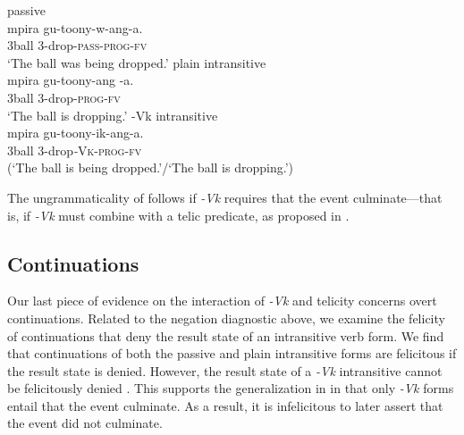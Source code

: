 \documentclass[output=paper]{langsci/langscibook}
\begin{document}
\ea\label{ex:gluckman:14} 
  \ea\label{ex:gluckman:14a}
  {{passive}}\\
  \gll mpira gu-toony-w-ang-a.\\
      3ball  3-drop-\textsc{pass}-\textsc{prog}-\textsc{fv}\\
  \glt ‘The ball was being dropped.’
  \ex\label{ex:gluckman:14b}
  {{ plain intransitive}}\\
  \gll mpira gu-toony-ang -a.\\
      3ball  3-drop-\textsc{prog}-\textsc{fv}\\
  \glt ‘The ball is dropping.’
  \ex\label{ex:gluckman:14c}
  {{ -Vk intransitive}}\\
  \gll *mpira gu-toony-ik-ang-a.\\
	3ball    3-drop\textit{-}\textsc{Vk}-\textsc{prog}-\textsc{fv}\\
  \glt  (‘The ball is being dropped.’/‘The ball is dropping.’)
  \z
\z

The ungrammaticality of  follows if \textit{-Vk} requires that the event culminate—that is, if \textit{-Vk} must combine with a telic predicate, as proposed in .

\subsection{Continuations}

Our last piece of evidence on the interaction of \textit{-Vk} and telicity concerns overt continuations. Related to the negation diagnostic above, we examine the felicity of continuations that deny the result state of an intransitive verb form. We find that continuations of both the passive  and plain intransitive  forms are felicitous if the result state is denied. However, the result state of a \textit{-Vk} intransitive cannot be felicitously denied . This supports the generalization in  in that only \textit{-Vk} forms entail that the event culminate. As a result, it is infelicitous to later assert that the event did not culminate.
\end{document}
